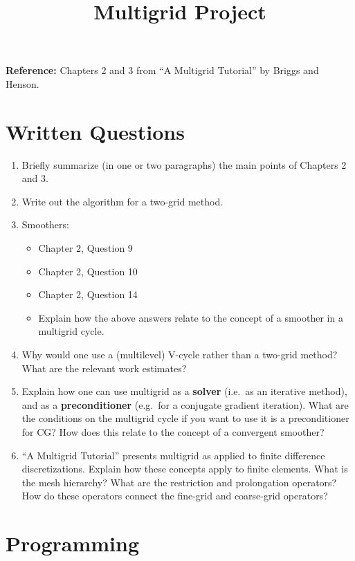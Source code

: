 \documentclass{article}
\begin{document}
\title{Multigrid Project}
\date{}
\maketitle

\noindent
\textbf{Reference:} Chapters 2 and 3 from ``A Multigrid Tutorial'' by Briggs and Henson.

\section*{Written Questions}

\begin{enumerate}
   \item Briefly summarize (in one or two paragraphs) the main points of Chapters 2 and 3.
   \item Write out the algorithm for a two-grid method.
   \item Smoothers:
   \begin{itemize}
      \item Chapter 2, Question 9
      \item Chapter 2, Question 10
      \item Chapter 2, Question 14
      \item Explain how the above answers relate to the concept of a smoother in a multigrid cycle.
   \end{itemize}
   \item Why would one use a (multilevel) V-cycle rather than a two-grid method? What are the relevant work estimates?
   \item Explain how one can use multigrid as a \textbf{solver} (i.e.\ as an iterative method), and as a \textbf{preconditioner} (e.g.\ for a conjugate gradient iteration). What are the conditions on the multigrid cycle if you want to use it is a preconditioner for CG? How does this relate to the concept of a convergent smoother?
   \item ``A Multigrid Tutorial'' presents multigrid as applied to finite difference discretizations. Explain how these concepts apply to finite elements. What is the mesh hierarchy? What are the restriction and prolongation operators? How do these operators connect the fine-grid and coarse-grid operators?
\end{enumerate}

\section*{Programming}
\end{document}
